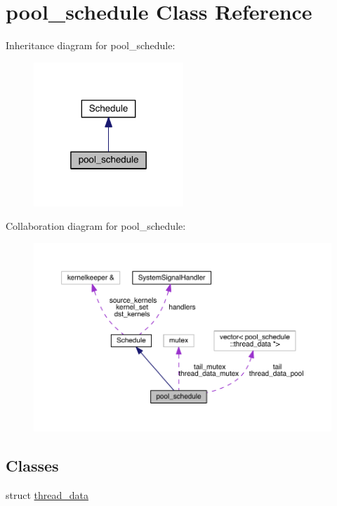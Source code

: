 \hypertarget{classpool__schedule}{}\section{pool\+\_\+schedule Class Reference}
\label{classpool__schedule}


Inheritance diagram for pool\+\_\+schedule\+:
\nopagebreak
\begin{figure}[H]
\begin{center}
\leavevmode
\includegraphics[width=160pt]{classpool__schedule__inherit__graph}
\end{center}
\end{figure}


Collaboration diagram for pool\+\_\+schedule\+:
\nopagebreak
\begin{figure}[H]
\begin{center}
\leavevmode
\includegraphics[width=350pt]{classpool__schedule__coll__graph}
\end{center}
\end{figure}
\subsection*{Classes}
\begin{DoxyCompactItemize}
\item 
struct \hyperlink{structpool__schedule_1_1thread__data}{thread\+\_\+data}
\end{DoxyCompactItemize}
